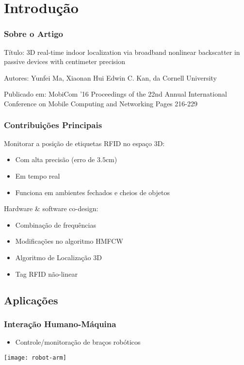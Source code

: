 \section{Introdução}

\begin{frame}
    \frametitle{Sobre o Artigo}
    \alert{Título:} 3D real-time indoor localization via broadband nonlinear backscatter in
    passive devices with centimeter precision

    \alert{Autores:} Yunfei Ma, Xiaonan Hui Edwin C. Kan, da \alert{Cornell University}

    \alert{Publicado em:} MobiCom '16 Proceedings of the 22nd Annual
    International Conference on Mobile Computing and Networking Pages 216-229

\end{frame}

\begin{frame}
  \frametitle{Contribuições Principais}

    Monitorar a posição de etiquetas RFID no espaço 3D:

    \begin{itemize}
      \item Com \alert{alta precisão} (erro de $3.5$cm)
      \item Em \alert{tempo real}
      \item Funciona em \alert{ambientes fechados e cheios de objetos}
    \end{itemize}

    Hardware \& software co-design:

    \begin{itemize}
        \item Combinação de frequências
        \item Modificações no algoritmo HMFCW
        \item Algoritmo de Localização 3D
        \item Tag RFID não-linear
    \end{itemize}
\end{frame}

\subsection{Aplicações}


\begin{frame}
  \frametitle{Interação Humano-Máquina}
  \begin{itemize}
    \item  Controle/monitoração de braços robóticos
  \end{itemize}

  \begin{center}
    \texttt{[image: robot-arm]}
  \end{center}
\end{frame}

